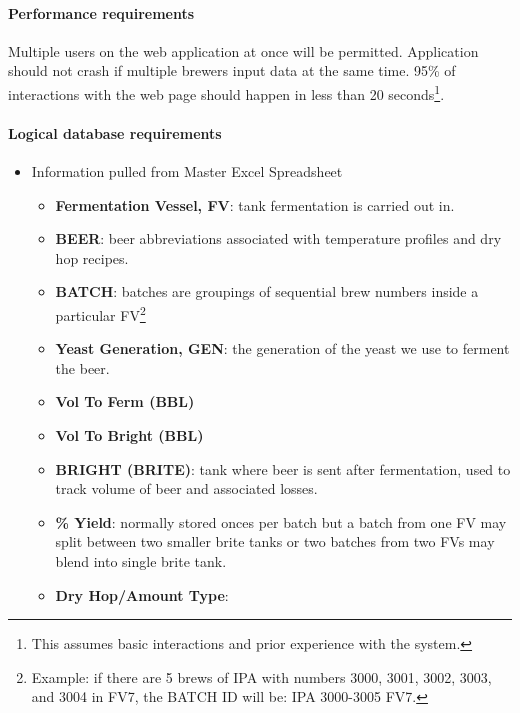 	\paragraph{Performance requirements}
		Multiple users on the web application at once will be permitted.
        Application should not crash if multiple brewers input data at the same time.
		95\% of interactions with the web page should happen in less than 20 seconds\footnote{This assumes basic interactions and prior experience with the system.}.

	\paragraph{Logical database requirements}
    \begin{itemize}
        \item{Information pulled from Master Excel Spreadsheet}
            \begin{itemize}
                \item{\textbf{Fermentation Vessel, FV}:
                    tank fermentation is carried out in.
                }
                \item{\textbf{BEER}:
                    beer abbreviations associated with temperature profiles and dry hop recipes.
                }
                \item{\textbf{BATCH}:
                    batches are groupings of sequential brew numbers inside a particular FV\footnote{Example: if there are 5 brews of IPA with numbers 3000, 3001, 3002, 3003, and 3004 in FV7, the BATCH ID will be: IPA 3000-3005 FV7.}
                }
                \item{\textbf{Yeast Generation, GEN}:
				    the generation of the yeast we use to ferment the beer.
                }
                \item{\textbf{Vol To Ferm (BBL)}}
                \item{\textbf{Vol To Bright (BBL)}}
                \item{\textbf{BRIGHT (BRITE)}:
                    tank where beer is sent after fermentation, used to track volume of beer and associated losses.
                }
                \item{\textbf{\% Yield}:
                    normally stored onces per batch but a batch from one FV may split between two smaller brite tanks or two batches from two FVs may blend into single brite tank.
                }
                \item{\textbf{Dry Hop/Amount Type}:
}
\end{itemize}
\end{itemize}
